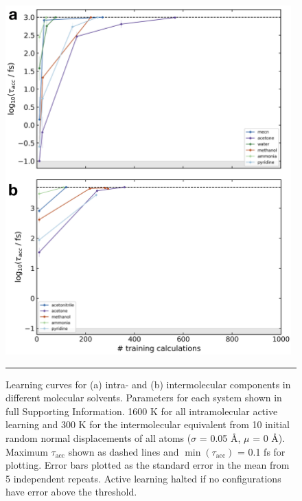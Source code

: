 \documentclass[../../main.tex]{subfiles}
\newcommand{\taua}{$\tau_\text{acc}$ }
\begin{document}
\begin{figure}[h!]
	\vspace{0.4cm}
	\centering
	\includegraphics[width=11cm]{6/gap/figs_si/fig14}
	\vspace{0.2cm}
	\hrule
	\caption{Learning curves for (a) intra- and (b) intermolecular components in different molecular solvents. Parameters for each system shown in full Supporting Information. 1600 K for all intramolecular active learning and 300 K for the intermolecular equivalent from 10 initial random normal displacements of all atoms ($\sigma$ = 0.05 \AA, $\mu$ = 0 \AA). Maximum \taua shown as dashed lines and $\min(\tau_\text{acc})$ = 0.1 fs for plotting. Error bars plotted as the standard error in the mean from 5 independent repeats. Active learning halted if no configurations have error above the threshold.}
	\label{fig::ml_si_14}
\end{figure}
\end{document}
